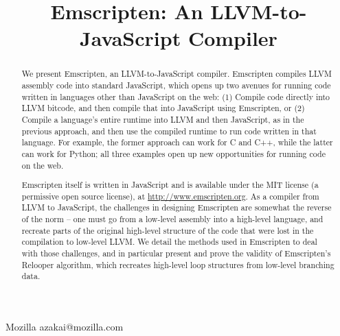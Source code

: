 \documentclass[preprint,10pt]{sigplanconf}
\begin{document}
\title{Emscripten: An LLVM-to-JavaScript Compiler}
\copyrightdata{[to be supplied]} 
\titlebanner{}        %
\preprintfooter{}   %
           {Mozilla}
           {azakai@mozilla.com}

\maketitle


\begin{abstract}
We present Emscripten, an LLVM-to-JavaScript compiler. Emscripten compiles
LLVM assembly code into standard JavaScript, which opens up two avenues for running code written
in languages other than JavaScript on the web: (1) Compile code directly into LLVM bitcode, and
then compile that into JavaScript using Emscripten, or (2) Compile
a language's entire runtime into LLVM and then JavaScript, as in the previous
approach, and then use the compiled runtime to run code written in that language. For example, the
former approach can work for C and C++, while the latter can work for Python; all three
examples open up new opportunities for running code on the web.

Emscripten itself is written in JavaScript and is available under the MIT
license (a permissive open source license), at \url{http://www.emscripten.org}.
As a compiler from LLVM to JavaScript, the challenges in designing
Emscripten are somewhat the reverse of the norm -- one must go from a low-level
assembly into a high-level language, and recreate parts of the original
high-level structure of the code that were lost in the compilation to
low-level LLVM. We detail the methods used in
Emscripten to deal with those challenges, and in particular present and prove
the validity of Emscripten's Relooper
algorithm, which recreates high-level loop structures from low-level
branching data.
\end{abstract}
\end{document}
